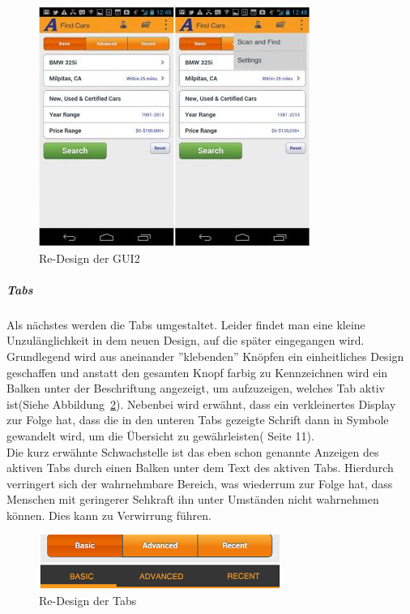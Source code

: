 \begin{figure}[h]
 \centering
 \includegraphics[height=0.40\textheight]{img/Design4.png}
 \caption{Re-Design der GUI2}
 \label{fig:design4}
\end{figure}

\subparagraph{Tabs}
\label{sub:tabs}

Als nächstes werden die Tabs umgestaltet. Leider findet man eine kleine Unzulänglichkeit in dem neuen Design, auf die später eingegangen wird. Grundlegend wird aus aneinander ''klebenden'' Knöpfen ein einheitliches Design geschaffen und anstatt den gesamten Knopf farbig zu Kennzeichnen wird ein Balken unter der Beschriftung angezeigt, um aufzuzeigen, welches Tab aktiv ist(Siehe Abbildung~\ref{fig:tabs}). Nebenbei wird erwähnt, dass ein verkleinertes Display zur Folge hat, dass die in den unteren Tabs gezeigte Schrift dann in Symbole gewandelt wird, um die Übersicht zu gewährleisten(\cite{AndroidDesignPatterns} Seite 11).\\

Die kurz erwähnte Schwachstelle ist das eben schon genannte Anzeigen des aktiven Tabs durch einen Balken unter dem Text des aktiven Tabs. Hierdurch verringert sich der wahrnehmbare Bereich, was wiederrum zur Folge hat, dass Menschen mit geringerer Sehkraft ihn unter Umständen nicht wahrnehmen können. Dies kann zu Verwirrung führen.\\

\begin{figure}[h]
 \centering
 \includegraphics[height=0.08\textheight]{img/tabs.png}
 \caption{Re-Design der Tabs}
 \label{fig:tabs}
\end{figure}

